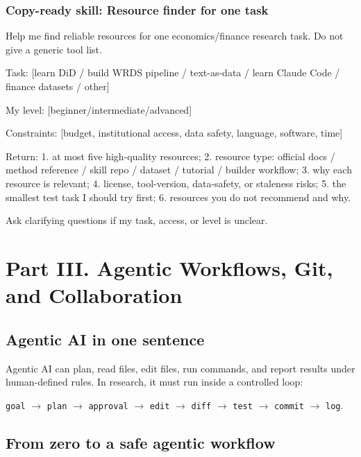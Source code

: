 \documentclass[11pt]{article}
\newcommand{\skill}[1]{\subsubsection*{Copy-ready skill: #1}}
\begin{document}
\skill{Resource finder for one task}

\begin{promptblock}
Help me find reliable resources for one economics/finance research task. Do not
give a generic tool list.

Task:
[learn DiD / build WRDS pipeline / text-as-data / learn Claude Code / finance datasets / other]

My level:
[beginner/intermediate/advanced]

Constraints:
[budget, institutional access, data safety, language, software, time]

Return:
1. at most five high-quality resources;
2. resource type: official docs / method reference / skill repo / dataset / tutorial / builder workflow;
3. why each resource is relevant;
4. license, tool-version, data-safety, or staleness risks;
5. the smallest test task I should try first;
6. resources you do not recommend and why.

Ask clarifying questions if my task, access, or level is unclear.
\end{promptblock}

\section{Part III. Agentic Workflows, Git, and Collaboration}

\subsection{Agentic AI in one sentence}

Agentic AI can plan, read files, edit files, run commands, and report results under human-defined rules. In research, it must run inside a controlled loop:

\begin{center}
\texttt{goal} \(\rightarrow\) \texttt{plan} \(\rightarrow\) \texttt{approval} \(\rightarrow\) \texttt{edit} \(\rightarrow\) \texttt{diff} \(\rightarrow\) \texttt{test} \(\rightarrow\) \texttt{commit} \(\rightarrow\) \texttt{log}.
\end{center}

\subsection{From zero to a safe agentic workflow}
\end{document}

